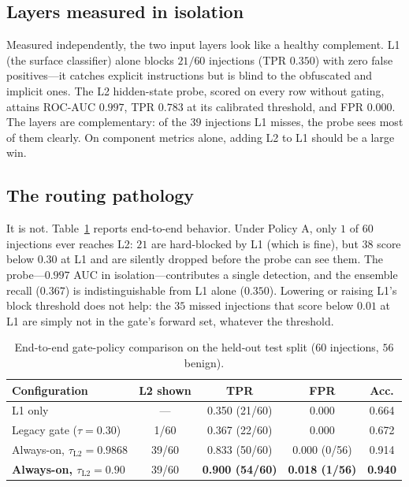 \documentclass[conference]{IEEEtran}
\begin{document}
\subsection{Layers measured in isolation}
\label{sec:isolated}
Measured independently, the two input layers look like a healthy complement.
L1 (the surface classifier) alone blocks $21/60$ injections (TPR $0.350$) with
zero false positives---it catches explicit instructions but is blind to the
obfuscated and implicit ones. The L2 hidden-state probe, scored on every row
without gating, attains ROC-AUC $0.997$, TPR $0.783$ at its calibrated
threshold, and FPR $0.000$. The layers are complementary: of the $39$
injections L1 misses, the probe sees most of them clearly. On component metrics
alone, adding L2 to L1 should be a large win.

\subsection{The routing pathology}
\label{sec:pathology}
It is not. Table~\ref{tab:gate} reports end-to-end behavior. Under Policy A,
only $1$ of $60$ injections ever reaches L2: $21$ are hard-blocked by L1
(which is fine), but $38$ score below $0.30$ at L1 and are silently dropped
before the probe can see them. The probe---$0.997$ AUC in isolation---contributes
a single detection, and the ensemble recall ($0.367$) is indistinguishable from
L1 alone ($0.350$). Lowering or raising L1's block threshold does not help: the
$35$ missed injections that score below $0.01$ at L1 are simply not in the
gate's forward set, whatever the threshold.

\begin{table}[!t]
\caption{End-to-end gate-policy comparison on the held-out test split
($60$ injections, $56$ benign).}
\label{tab:gate}
\centering
\begin{tabular}{@{}l c c c c@{}}
\toprule
\textbf{Configuration} & \textbf{L2 shown} & \textbf{TPR} & \textbf{FPR} & \textbf{Acc.}\\
\midrule
L1 only & --- & 0.350 (21/60) & 0.000 & 0.664\\
Legacy gate ($\tau{=}0.30$) & 1/60 & 0.367 (22/60) & 0.000 & 0.672\\
Always-on, $\tau_{\text{L2}}{=}0.9868$ & 39/60 & 0.833 (50/60) & 0.000 (0/56) & 0.914\\
\textbf{Always-on, $\tau_{\text{L2}}{=}0.90$} & 39/60 & \textbf{0.900 (54/60)} & \textbf{0.018 (1/56)} & \textbf{0.940}\\
\bottomrule
\end{tabular}
\end{table}
\end{document}
